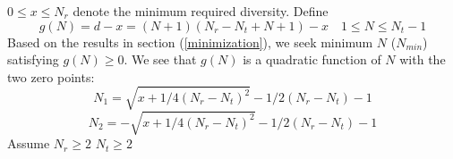 \documentclass[12pt,a4paper,final]{article}
\begin{document}
\begin{spacing}{2.5}
 $0\leq x\leq N_{r}$ denote the minimum required diversity.
 Define
\begin{equation}
g(N)=d-x=(N+1)(N_{r}-N_{t}+N+1)-x\label{equation17}\quad 1\leq N\leq N_{t}-1
\end{equation}
Based on the results in section (\ref{minimization}), we seek minimum $N$ ($N_{min}$) satisfying $g(N)\geq 0$. We see that $g(N)$ is a quadratic function of $N$ with the two zero points:
\begin{equation}
N_{1}=\sqrt{x+1/4(N_{r}-N_{t})^2}-1/2(N_{r}-N_{t})-1\label{equation18}
\end{equation}
 \begin{equation}
N_{2}=-\sqrt{x+1/4(N_{r}-N_{t})^2}-1/2(N_{r}-N_{t})-1\label{equation19}
\end{equation} 
Assume $N_{r}\geq 2$ $N_{t}\geq 2$


\end{spacing}
\end{document}
